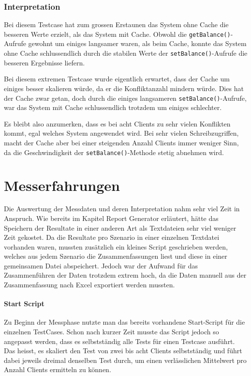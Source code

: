 \subsubsection{Interpretation}

Bei diesem Testcase hat zum grossen Erstaunen das System ohne Cache die besseren Werte erzielt, als das System mit Cache. Obwohl die \texttt{getBalance()}-Aufrufe gewohnt um einiges langsamer waren, als beim Cache, konnte das System ohne Cache schlussendlich durch die stabilen Werte der \texttt{setBalance()}-Aufrufe die besseren Ergebnisse liefern.

Bei diesem extremen Testcase wurde eigentlich erwartet, dass der Cache um einiges besser skalieren würde, da er die Konfliktanzahl mindern würde. Dies hat der Cache zwar getan, doch durch die einiges lang\-sa\-mer\-en \texttt{set\-Balance()}-Auf\-ru\-fe, war das System mit Cache schlus\-send\-lich trotz\-dem um ei\-nig\-es sch\-lech\-ter. 

Es bleibt also anzumerken, dass es bei acht Clients zu sehr vielen Konflikten kommt, egal welches System angewendet wird. Bei sehr vielen Schreibzugriffen, macht der Cache aber bei einer steigenden Anzahl Clients immer weniger Sinn, da die Geschwindigkeit der  \texttt{setBalance()}-Methode stetig abnehmen wird.

\section{Messerfahrungen}
Die Auswertung der Messdaten und deren Interpretation nahm sehr viel Zeit in Anspruch. Wie bereits im Kapitel Report Generator erläutert, hätte das Speichern der Resultate in einer anderen Art als Textdateien sehr viel weniger Zeit gekostet. Da die Resultate pro Szenario in einer einzelnen Textdatei vorhanden waren, mussten zusätzlich ein kleines Script geschrieben werden, welches  aus jedem Szenario die Zusammenfassungen liest und diese in einer gemeinsamen Datei abspeichert. Jedoch war der Aufwand für das Zusammenführen der Daten trotzdem extrem hoch, da die Daten manuell aus der Zusammenfassung nach Excel exportiert werden mussten. 

\paragraph{Start Script}
Zu Beginn der Messphase nutzte man das bereits vorhandene Start-Script für die einzelnen TestCases. Schon nach kurzer Zeit musste das Script jedoch so angepasst werden, dass es selbstständig alle Tests für einen Testcase ausführt. Das heisst, es skaliert den Test von zwei bis acht Clients selbstständig und führt dabei jeweils dreimal denselben Test durch, um einen verlässlichen Mittelwert pro Anzahl Clients ermitteln zu können.


